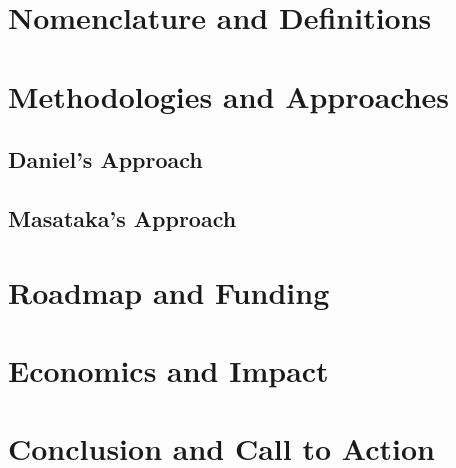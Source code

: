 \documentclass[10pt]{article}
\begin{document}
\begin{sloppypar}
  \section{Nomenclature and Definitions}
  \label{sec:nomenclature}



  \section{Methodologies and Approaches}
  \label{sec:methodologies}


  \subsection{Daniel's Approach}
  \label{sec:daniel-approach}

  \subsection{Masataka's Approach}
  \label{sec:masataka-approach}



  \section{Roadmap and Funding}
  \label{sec:next-years}

  \section{Economics and Impact}
  \label{sec:economics}

  \section{Conclusion and Call to Action}
  \label{sec:conclusion}


  \pagebreak
  
  
  \nocite{*}

\end{sloppypar}
\end{document}
